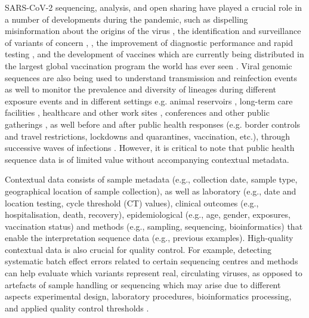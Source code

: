 SARS-CoV-2 sequencing, analysis, and open sharing have played a crucial role in a number of developments during the pandemic, such as dispelling misinformation about the origins of the virus \cite{andersen_proximal_2020}, the identification and surveillance of variants of concern \cite{gupta_will_2021}, \cite{public_health_england_sars-cov-2_nodate}, the improvement of diagnostic performance and rapid testing \cite{los_alamos_national_laboratory_silico_nodate, kuchinski_mutations_2022, ganguli_rapid_2020}, and the development of vaccines which are currently being distributed in the largest global vaccination program the world has ever seen \cite{world_health_organization_covid-19_nodate}. Viral genomic sequences are also being used to understand transmission and reinfection events \cite{tillett_genomic_2021} as well to monitor the prevalence and diversity of lineages during different exposure events and in different settings e.g. animal reservoirs \cite{oude_munnink_transmission_2021}, long-term care facilities \cite{lai_covid-19_2020, aggarwal_role_2020, murti_investigation_2021}, healthcare and other work sites \cite{dyal_covid-19_2020, gunther_sarscov2_2020, taylor_serial_2020, loconsole_investigation_2021, frampton_genomic_2021}, conferences and other public gatherings \cite{da_silva_filipe_genomic_2021}, as well before and after public health responses (e.g. border controls and travel restrictions, lockdowns and quarantines, vaccination, etc.), through successive waves of infections \cite{oude_munnink_rapid_2020, du_plessis_establishment_2021, githinji_tracking_2020, meredith_rapid_2020, zhang_analysis_2020, long_molecular_2020, geoghegan_genomic_2020, seemann_tracking_2020, mclaughlin_early_2021, fauver_coast--coast_2020, knock_key_2021, lane_genomics-informed_2021}. However, it is critical to note that public health sequence data is of limited value without accompanying contextual metadata. 

Contextual data consists of sample metadata (e.g., collection date, sample type, geographical location of sample collection), as well as laboratory (e.g., date and location testing, cycle threshold (CT) values), clinical outcomes (e.g., hospitalisation, death, recovery), epidemiological (e.g., age, gender, exposures, vaccination status) and methods (e.g., sampling, sequencing, bioinformatics) that enable the interpretation sequence data (e.g., previous examples). High-quality contextual data is also crucial for quality control. For example, detecting systematic batch effect errors related to certain sequencing centres and methods can help evaluate which variants represent real, circulating viruses, as opposed to artefacts of sample handling or sequencing which may arise due to different aspects experimental design, laboratory procedures, bioinformatics processing, and applied quality control thresholds \cite{de_maio_issues_2020, rayko_quality_2020, poon_recurrent_2005}. 

